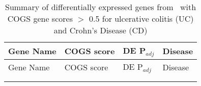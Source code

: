 
\begin{center}

\centering
\begin{longtable}{| L{5cm} | R{1.2cm} | R{1cm} | L{1.5cm} |}
\caption{Summary of differentially expressed genes from~\citet{PetersLyonsLeeEtAl2016} with COGS gene scores $>$ 0.5 for ulcerative colitis (UC) and Crohn's Disease (CD)}
\label{tab:ibd_genes}\\
  \hline{}   Gene Name & COGS score & DE P$_{adj}$ & Disease \\ \hline \hline  
  \endfirsthead
   \hline{}   Gene Name & COGS score & DE P$_{adj}$ & Disease \\ \hline \hline  
  \endhead
  \hline {}  \\ \hline 
  \endfoot
  \hline \hline 
  \endlastfoot


\end{longtable}
\end{center}
